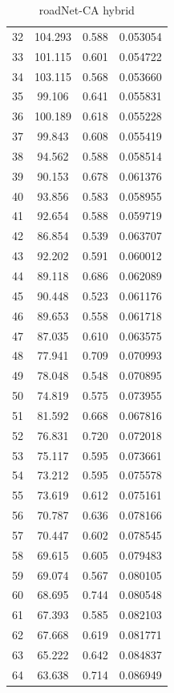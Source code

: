 \documentclass[10pt,twocolumn,letterpaper]{article}
\begin{document}
\begin{table}[h]
\begin{tabular}{@{}c|ccc@{}}
32 & 104.293 & 0.588 & 0.053054 \\
33 & 101.115 & 0.601 & 0.054722 \\
34 & 103.115 & 0.568 & 0.053660 \\
35 & 99.106 & 0.641 & 0.055831 \\
36 & 100.189 & 0.618 & 0.055228 \\
37 & 99.843 & 0.608 & 0.055419 \\
38 & 94.562 & 0.588 & 0.058514 \\
39 & 90.153 & 0.678 & 0.061376 \\
40 & 93.856 & 0.583 & 0.058955 \\
41 & 92.654 & 0.588 & 0.059719 \\
42 & 86.854 & 0.539 & 0.063707 \\
43 & 92.202 & 0.591 & 0.060012 \\
44 & 89.118 & 0.686 & 0.062089 \\
45 & 90.448 & 0.523 & 0.061176 \\
46 & 89.653 & 0.558 & 0.061718 \\
47 & 87.035 & 0.610 & 0.063575 \\
48 & 77.941 & 0.709 & 0.070993 \\
49 & 78.048 & 0.548 & 0.070895 \\
50 & 74.819 & 0.575 & 0.073955 \\
51 & 81.592 & 0.668 & 0.067816 \\
52 & 76.831 & 0.720 & 0.072018 \\
53 & 75.117 & 0.595 & 0.073661 \\
54 & 73.212 & 0.595 & 0.075578 \\
55 & 73.619 & 0.612 & 0.075161 \\
56 & 70.787 & 0.636 & 0.078166 \\
57 & 70.447 & 0.602 & 0.078545 \\
58 & 69.615 & 0.605 & 0.079483 \\
59 & 69.074 & 0.567 & 0.080105 \\
60 & 68.695 & 0.744 & 0.080548 \\
61 & 67.393 & 0.585 & 0.082103 \\
62 & 67.668 & 0.619 & 0.081771 \\
63 & 65.222 & 0.642 & 0.084837 \\
64 & 63.638 & 0.714 & 0.086949 \\
\bottomrule
\end{tabular}
\caption{roadNet-CA hybrid}
\end{table}
\end{document}
